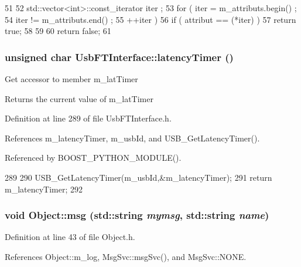 \begin{DoxyCode}
51   {
52     std::vector<int>::const_iterator iter ;
53     for ( iter  = m_attributs.begin() ;
54           iter != m_attributs.end()   ;
55           ++iter ) {
56       if ( attribut == (*iter) ) {
57         return true;
58       }
59     }
60     return false;
61   }
\end{DoxyCode}
\hypertarget{classUsbFTInterface_a4fa70ce4a4cd4f8f01cdeb4835f11276}{
\subsubsection[{latencyTimer}]{\setlength{\rightskip}{0pt plus 5cm}unsigned char UsbFTInterface::latencyTimer ()}}
\label{classUsbFTInterface_a4fa70ce4a4cd4f8f01cdeb4835f11276}
Get accessor to member m\_\-latTimer \begin{DoxyReturn}{Returns}
the current value of m\_\-latTimer 
\end{DoxyReturn}


Definition at line 289 of file UsbFTInterface.h.

References m\_\-latencyTimer, m\_\-usbId, and USB\_\-GetLatencyTimer().

Referenced by BOOST\_\-PYTHON\_\-MODULE().


\begin{DoxyCode}
289                                 {
290     USB_GetLatencyTimer(m_usbId,&m_latencyTimer);
291     return m_latencyTimer;
292   }
\end{DoxyCode}
\hypertarget{classObject_ac5d59299273cee27aacf7de00d2e7034}{
\subsubsection[{msg}]{\setlength{\rightskip}{0pt plus 5cm}void Object::msg (std::string {\em mymsg}, \/  std::string {\em name})}}
\label{classObject_ac5d59299273cee27aacf7de00d2e7034}


Definition at line 43 of file Object.h.

References Object::m\_\-log, MsgSvc::msgSvc(), and MsgSvc::NONE.


